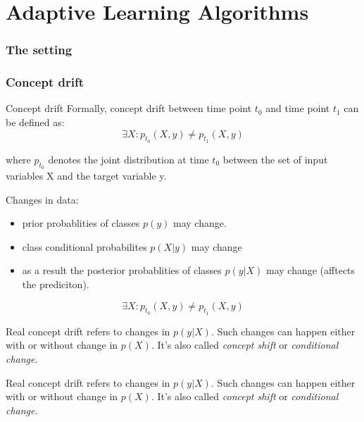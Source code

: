 \section{Adaptive Learning Algorithms}

\begin{frame}
\frametitle{The setting}



\end{frame}

\begin{frame}[allowframebreaks]
\frametitle{Concept drift}
\begin{de}{Concept drift}
Formally, concept drift between time point $t_0$ and time point $t_1$ can be defined as:
$$\exists X:p_{t_0}(X,y) \neq p_{t_1}(X,y)$$

where $p_{t_0}$ denotes the joint distribution at time $t_0$ between the set of input variables X and the target variable y.
\end{de}

Changes in data:

\begin{itemize}
\item prior probablities of classes $p(y)$ may change.
\item class conditional probabilites $p(X|y)$ may change
\item as a result the posterior probablities of classes $p(y|X)$ may change (afftects the prediciton).
\end{itemize}

\framebreak
$$\exists X:p_{t_0}(X,y) \neq p_{t_1}(X,y)$$
\begin{de}{Real concept drift}
refers to changes in $p(y|X)$. Such changes can happen either with
or without change in $p(X)$. It's also called \textit{concept shift} or \textit{conditional change}.
\end{de}

\begin{de}{Real concept drift}
refers to changes in $p(y|X)$. Such changes can happen either with
or without change in $p(X)$. It's also called \textit{concept shift} or \textit{conditional change}.
\end{de}
\end{frame}


